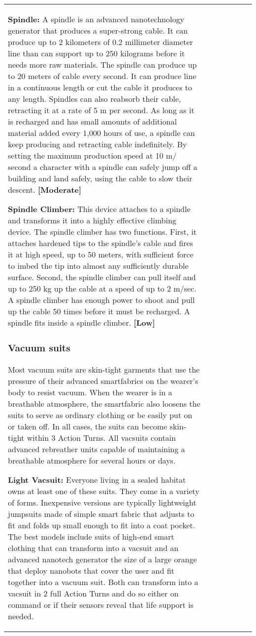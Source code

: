 \begin{tabular}{|l|l|l|l|l|l|l|}
\textbf{Spindle:} A spindle is an advanced nanotechnology generator that produces a super-strong cable. It can produce up to 2 kilometers of 0.2 millimeter diameter line than can support up to 250 kilograms before it needs more raw materials. The spindle can produce up to 20 meters of cable every second. It can produce line in a continuous length or cut the cable it produces to any length. Spindles can also reabsorb their cable, retracting it at a rate of 5 m per second. As long as it is recharged and has small amounts of additional material added every 1,000 hours of use, a spindle can keep producing and retracting cable indefinitely. By setting the maximum production speed at 10 m/ second a character with a spindle can safely jump off a building and land safely, using the cable to slow their descent. \textbf{[Moderate]} 

\textbf{Spindle Climber:} This device attaches to a spindle and transforms it into a highly effective climbing device. The spindle climber has two functions. First, it attaches hardened tips to the spindle’s cable and fires it at high speed, up to 50 meters, with sufficient force to imbed the tip into almost any sufficiently durable surface. Second, the spindle climber can pull itself and up to 250 kg up the cable at a speed of up to 2 m/sec. A spindle climber has enough power to shoot and pull up the cable 50 times before it must be recharged. A spindle fits inside a spindle climber. \textbf{[Low]} 

\subsubsection{Vacuum suits} 

Most vacuum suits are skin-tight garments that use the pressure of their advanced smartfabrics on the wearer’s body to resist vacuum. When the wearer is in a breathable atmosphere, the smartfabric also loosens the suits to serve as ordinary clothing or be easily put on or taken off. In all cases, the suits can become skin-tight within 3 Action Turns. All vacsuits contain advanced rebreather units capable of maintaining a breathable atmosphere for several hours or days. 

\textbf{Light Vacsuit:} Everyone living in a sealed habitat owns at least one of these suits. They come in a variety of forms. Inexpensive versions are typically lightweight jumpsuits made of simple smart fabric that adjusts to fit and folds up small enough to fit into a coat pocket. The best models include suits of high-end smart clothing that can transform into a vacsuit and an advanced nanotech generator the size of a large orange that deploy nanobots that cover the user and fit together into a vacuum suit. Both can transform into a vacsuit in 2 full Action Turns and do so either on command or if their sensors reveal that life support is needed. 


\end{tabular}

